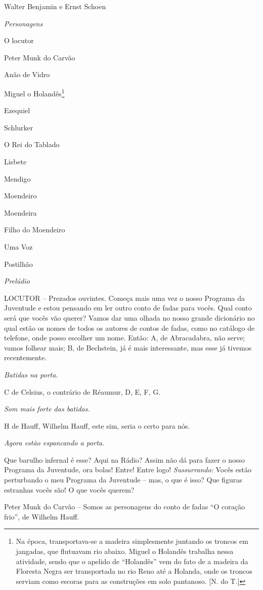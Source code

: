 Walter Benjamin e Ernst Schoen

\emph{Personagens}

O locutor

Peter Munk do Carvão

Anão de Vidro

Miguel o Holandês\footnote{Na época, transportava-se a madeira
  simplesmente juntando os troncos em jangadas, que flutuavam rio
  abaixo. Miguel o Holandês trabalha nessa atividade, sendo que o
  apelido de ``Holandês'' vem do fato de a madeira da Floresta Negra ser
  transportada no rio Reno até a Holanda, onde os troncos serviam como
  escoras para as construções em solo pantanoso. {[}N. do T.{]}}

Ezequiel

Schlurker

O Rei do Tablado

Lisbete

Mendigo

Moendeiro

Moendeira

Filho do Moendeiro

Uma Voz

Postilhão

\emph{Prelúdio}

LOCUTOR -- Prezados ouvintes. Começa mais uma vez o nosso Programa da
Juventude e estou pensando em ler outro conto de fadas para vocês. Qual
conto será que vocês vão querer? Vamos dar uma olhada no nosso grande
dicionário no qual estão os nomes de todos os autores de contos de
fadas, como no catálogo de telefone, onde posso escolher um nome. Então:
A, de Abracadabra, não serve; vamos folhear mais; B, de Bechstein, já é
mais interessante, mas esse já tivemos recentemente.

\emph{Batidas na porta.}

C de Celsius, o contrário de Réaumur, D, E, F, G.

\emph{Som mais forte das batidas.}

H de Hauff, Wilhelm Hauff, este sim, seria o certo para nós.

\emph{Agora estão espancando a porta}.

Que barulho infernal é esse? Aqui na Rádio? Assim não dá para fazer o
nosso Programa da Juventude, ora bolas! Entre! Entre logo!
\emph{Sussurrando:} Vocês estão perturbando o meu Programa da Juventude
-- mas, o que é isso? Que figuras estranhas vocês são! O que vocês
querem?

Peter Munk do Carvão -- Somos as personagens do conto de fadas ``O
coração frio'', de Wilhelm Hauff.

